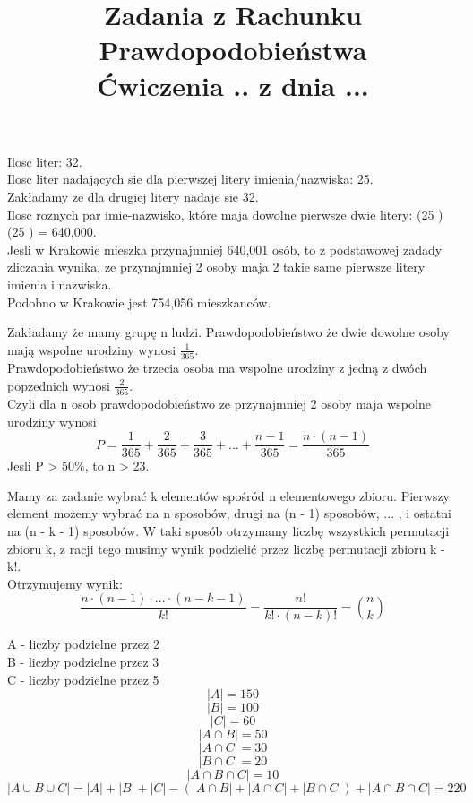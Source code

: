 \documentclass[fleqn]{article}
\begin{document}
\title{Zadania z Rachunku Prawdopodobieństwa \\ Ćwiczenia .. z dnia ...}
\date{}
\medskip
{}
\medskip

Ilosc liter: 32. \\
Ilosc liter nadających sie dla pierwszej litery imienia/nazwiska: 25. \\
Zakładamy ze dla drugiej litery nadaje sie 32. \\
Ilosc roznych par imie-nazwisko, które maja dowolne pierwsze dwie litery: (25 ) \cdot (25 ) = 640,000. \\
Jesli w Krakowie mieszka przynajmniej 640,001 osób, to z podstawowej zadady zliczania wynika, ze przynajmniej 2 osoby maja 2 takie same pierwsze litery imienia i nazwiska. \\
Podobno w Krakowie jest 754,056 mieszkanców. \\
\medskip
{}
\medskip

Zakładamy że mamy grupę n ludzi.
Prawdopodobieństwo że dwie dowolne osoby mają wspolne urodziny wynosi $\frac{1}{365}$.\\
Prawdopodobieństwo że trzecia osoba ma wspolne urodziny z jedną z dwóch popzednich wynosi $\frac{2}{365}$.\\
Czyli dla n osob prawdopodobieństwo ze przynajmniej 2 osoby maja wspolne urodziny wynosi
\[P = \frac{1}{365} + \frac{2}{365} + \frac{3}{365} + ... + \frac{n - 1}{365} = \frac{n\cdot(n-1)}{365}\]
Jesli P > 50\%, to n > 23.
\medskip

\medskip

Mamy za zadanie wybrać k elementów spośród n elementowego zbioru. Pierwszy element możemy wybrać na n sposobów, drugi na (n - 1) sposobów, ... , i ostatni na (n - k - 1) sposobów. W taki sposób otrzymamy liczbę wszystkich permutacji zbioru k, z racji tego musimy wynik podzielić przez liczbę permutacji zbioru k - k!.\\
Otrzymujemy wynik:\\
\[\frac{n\cdot(n-1)\cdot...\cdot(n-k-1)}{k!} = \frac{n!}{k!\cdot(n-k)!}={n \choose k}\]

\medskip


\medskip

A - liczby podzielne przez 2 \\
B - liczby podzielne przez 3 \\
C - liczby podzielne przez 5 \\
\[|A| = 150\]
\[|B| = 100\]
\[|C| = 60 \]
\[|A \cap B| = 50\]
\[|A \cap C| = 30\]
\[|B \cap C| = 20\]
\[|A \cap B \cap C| = 10\]
\[|A \cup B \cup C| = |A| + |B| + |C| - (|A \cap B|  + |A \cap C| + |B \cap C|) + |A \cap B \cap C| = 220 \]
\end{document}
